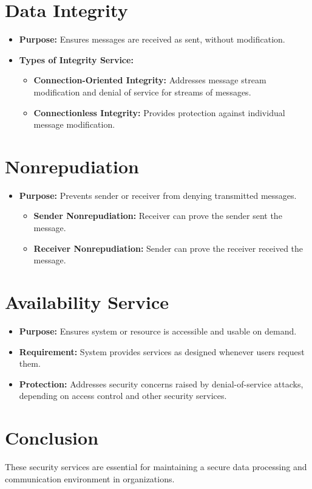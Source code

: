\section{Data Integrity}
\begin{itemize}
    \item \textbf{Purpose:} Ensures messages are received as sent, without modification.
    \item \textbf{Types of Integrity Service:}
    \begin{itemize}
        \item \textbf{Connection-Oriented Integrity:} Addresses message stream modification and denial of service for streams of messages.
        \item \textbf{Connectionless Integrity:} Provides protection against individual message modification.
    \end{itemize}
\end{itemize}

\section{Nonrepudiation}
\begin{itemize}
    \item \textbf{Purpose:} Prevents sender or receiver from denying transmitted messages.
    \begin{itemize}
        \item \textbf{Sender Nonrepudiation:} Receiver can prove the sender sent the message.
        \item \textbf{Receiver Nonrepudiation:} Sender can prove the receiver received the message.
    \end{itemize}
\end{itemize}

\section{Availability Service}
\begin{itemize}
    \item \textbf{Purpose:} Ensures system or resource is accessible and usable on demand.
    \item \textbf{Requirement:} System provides services as designed whenever users request them.
    \item \textbf{Protection:} Addresses security concerns raised by denial-of-service attacks, depending on access control and other security services.
\end{itemize}

\section{Conclusion}
These security services are essential for maintaining a secure data processing and communication environment in organizations.
